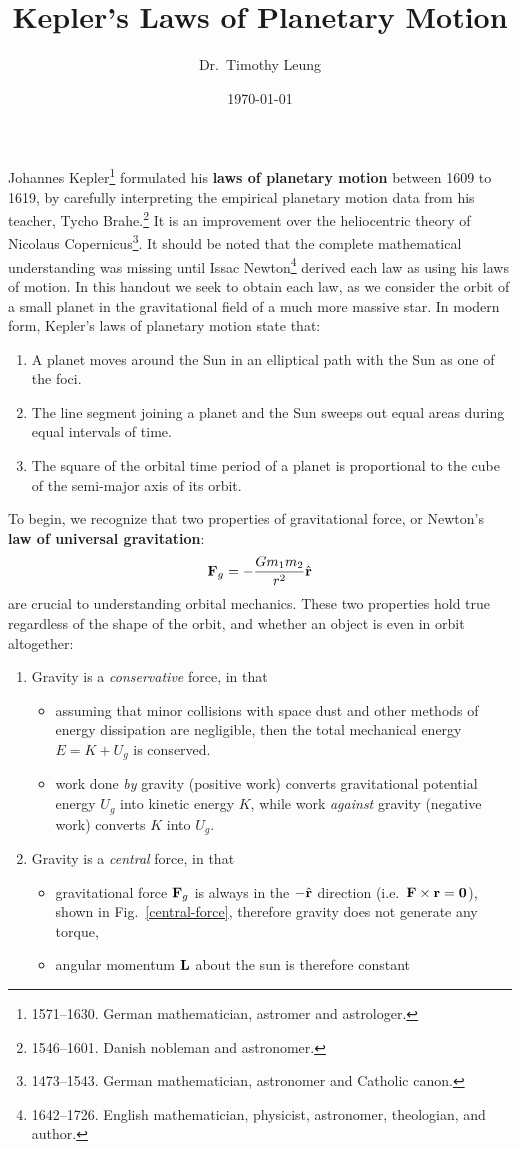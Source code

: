 \documentclass{../../../oss-handout}
\title{Kepler's Laws of Planetary Motion}
\author{Dr.\ Timothy Leung}
\date{\today}
\newcommand{\mb}[1]{\ensuremath\mathbf{#1}}
\begin{document}
\thispagestyle{title}
\gentitle

Johannes Kepler\footnote{1571--1630. German mathematician, astromer and
  astrologer.} formulated his \textbf{laws of planetary motion}
between 1609 to 1619, by carefully interpreting the empirical planetary motion
data from his teacher, Tycho Brahe.\footnote{1546--1601. Danish nobleman and
  astronomer.} It is an improvement over the heliocentric
theory of Nicolaus Copernicus\footnote{1473--1543. German mathematician,
  astronomer and Catholic canon.}. It should be noted that the complete
mathematical understanding was missing until Issac Newton\footnote{1642--1726.
  English mathematician, physicist, astronomer, theologian, and author.}
derived each law as using his laws of motion. In this handout we seek to obtain
each law, as we consider the orbit of a small planet in the gravitational field
of a much more massive star. In modern form, Kepler's laws of planetary motion
state that:
\begin{enumerate}[nosep]
\item A planet moves around the Sun in an elliptical path with the Sun as one
  of the foci.
\item The line segment joining a planet and the Sun sweeps out equal areas
  during equal intervals of time.
\item The square of the orbital time period of a planet is proportional to the
  cube of the semi-major axis of its orbit.
\end{enumerate}
To begin, we recognize that two properties of gravitational force, or Newton's
\textbf{law of universal gravitation}:
\begin{equation}
  \mb{F}_g=-\frac{Gm_1m_2}{r^2}\hat{\mb{r}}
\end{equation}
are crucial to
understanding orbital mechanics. These two properties hold true regardless
of the shape of the orbit, and whether an object is even in orbit altogether:
\begin{enumerate}[topsep=0pt]
\item Gravity is a \emph{conservative} force, in that
  \begin{itemize}[nosep]
  \item assuming that minor collisions with space dust and other methods of
    energy dissipation are negligible, then the total mechanical energy
    $E=K+U_g$ is conserved.
  \item work done \emph{by} gravity (positive work) converts gravitational
    potential energy $U_g$ into kinetic energy $K$, while work \emph{against}
    gravity (negative work) converts $K$ into $U_g$.
  \end{itemize}
\item Gravity is a \emph{central} force, in that
  \begin{itemize}[nosep]
  \item gravitational force $\mb{F}_g$ is always in the $-\hat{\mb{r}}$
    direction (i.e.\ $\mb{F}\times\mb{r}=\mb{0}$), shown in
    Fig.~\ref{central-force}, therefore gravity does not generate any torque,
  \item angular momentum $\mb{L}$ about the sun is therefore constant
  \end{itemize}
\end{enumerate}
\end{document}
